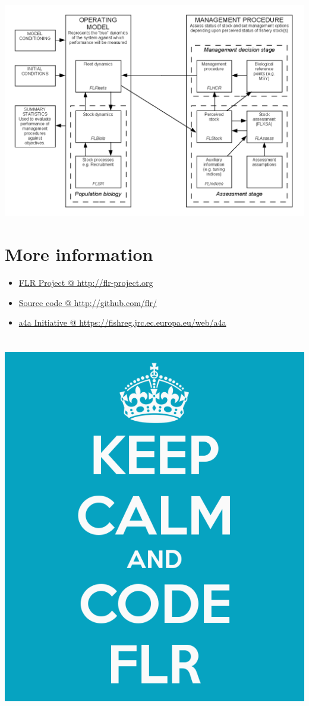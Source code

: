 \documentclass[]{article}
\providecommand{\tightlist}{%
  \setlength{\itemsep}{0pt}\setlength{\parskip}{0pt}}
\begin{document}
\centering
\includegraphics[keepaspectratio, height=0.8\textheight]{graphics/MSE.png}

\section{More information}\label{more-information}

\begin{itemize}
\tightlist
\item
  \href{http://flr-project.org}{FLR Project @ http://flr-project.org}
\item
  \href{http://gtihub.com/flr/}{Source code @ http://github.com/flr/}
\item
  \href{https://fishreg.jrc.ec.europa.eu/web/a4a}{a4a Initiative @
  https://fishreg.jrc.ec.europa.eu/web/a4a}
\end{itemize}

\section{}\label{section-1}

\centering
\includegraphics[keepaspectratio, height=0.8\textheight]{graphics/keep-calm-and-code-flr.png}
\end{document}
